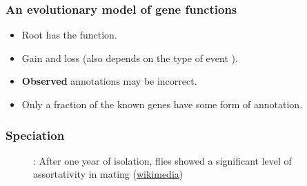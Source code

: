 \documentclass[aspectratio=169,9pt,handout]{beamer}
\begin{document}
\begin{frame}[label=aphylographicalview-altview,c]
	\frametitle{An evolutionary model of gene functions}
	\def\shadowsize{2pt}
	
	\begin{minipage}[m]{.60\linewidth}
		\begin{figure}
			\footnotesize
			\centering
			\def\svgwidth{.9\linewidth}
		\end{figure}
	\end{minipage}
	\hfill
	\begin{minipage}[m]{.38\linewidth}
		\pause
		\begin{itemize}
			\item \textcolor{rootnode}{Root has the function.}\pause[4]
			\item \textcolor{innernode}{Gain\pause{} and loss\pause{} (also depends on the type of event \hyperlink{duplicationvsspeciation}{}}).\pause
			\item \textcolor{leafnode}{\textbf{Observed} annotations may be incorrect.}\pause
			\item Only a fraction of the known genes have some form of annotation.
		\end{itemize}
		\vfill\hfill\hyperlink{aphylographicalview}{}
	\end{minipage}
	
\end{frame}


\begin{frame}[label = duplicationvsspeciation]
\frametitle{Speciation}
\begin{figure}
\centering
\def\svgwidth{.8\linewidth}
\tiny

\caption{\cite{Dodd1989}: After one year of isolation, flies showed a significant level of assortativity in mating (\href{https://commons.wikimedia.org/wiki/File:Drosophila_speciation_experiment.svg}{wikimedia})}
\end{figure}

\vfill\hfill \hyperlink{aphylographicalview}{}

\end{frame}
\end{document}
